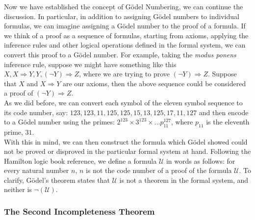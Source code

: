 Now we have established the concept of G\"odel Numbering, we can continue the discussion.  In particular, in addition to assigning G\"odel numbers to individual formulas, we can imagine assigning a G\"odel number to the proof of a formula.  If we think of a proof as a sequence of formulas, starting from axioms, applying the inference rules and other logical operations defined in the formal system, we can convert this proof to a G\"odel number.  For example, taking the \textit{modus ponens} inference rule, suppose we might have something like this $X,X\Longrightarrow Y, Y,( \neg Y) \Longrightarrow Z$, where we are trying to prove $(\neg Y) \Longrightarrow Z$.  Suppose that $X$ and $X \Longrightarrow Y$ are our axioms, then the above sequence could be considered a proof of $(\neg Y) \Longrightarrow Z$.\\
As we did before, we can convert each symbol of the eleven symbol sequence to its code number, say: $123,123,11,125,125, 15,13,125,17,11,127$ and then encode to a G\"odel number using the primes: $2^{123} \times 3^{123} \times \ldots p_{11}^{127}$, where $p_{11}$ is the eleventh prime, $31$.\\

With this in mind, we can then construct the formula which G\"odel showed could not be proved or disproved in the particular formal system at hand.  Following the Hamilton logic book reference, we define a formula $\mathcal{U}$ in words as follows:  for every natural number $n$, $n$ is not the code number of a proof of the formula $\mathcal{U}$.  To clarify, G\"odel's theorem states that $\mathcal{U}$ is not a theorem in the formal system, and neither is $\neg (\mathcal{U})$.  




\subsubsection{The Second Incompleteness Theorem}

